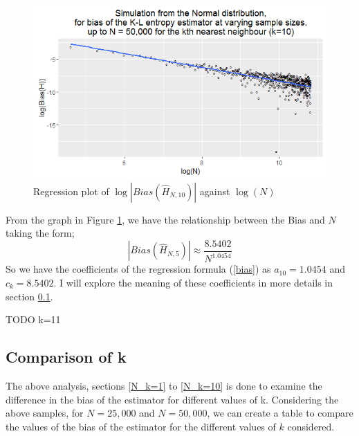 \documentclass{report}
\begin{document}
\begin{figure}
  \begin{center}
    \includegraphics[width=\textwidth]{./Graphs/new_normal_k=10.png}
  \end{center}
\caption{Regression plot of $\log|Bias(\hat{H}_{N, 10})|$ against $\log(N)$}
  \label{normal_k=10_graph}
\end{figure}

From the graph in Figure \ref{normal_k=10_graph}, we have the relationship between the Bias and $N$ taking the form;
\begin{equation}
|Bias(\hat{H}_{N, 5})| \approx \frac{8.5402}{N^{1.0454}} \nonumber
\end{equation}
So we have the coefficients of the regression formula (\ref{bias}) as $a_{10} = 1.0454$ and $c_{k} = 8.5402$. I will explore the meaning of these coefficients in more details in section \ref{N_compare_k}.



TODO
k=11


\subsection{Comparison of k} \label{N_compare_k}
The above analysis, sections \ref{N_k=1} to \ref{N_k=10} is done to examine the difference in the bias of the estimator for different values of k. Considering the above samples, for $N=25,000$ and $N=50,000$, we can create a table to compare the values of the bias of the estimator for the different values of $k$ considered.
\end{document}
